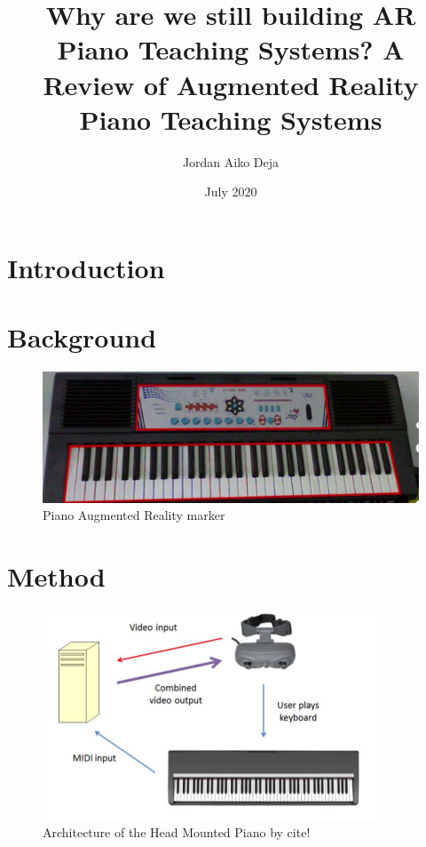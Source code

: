 \documentclass{article}
\title{Why are we still building AR Piano Teaching Systems? A Review of Augmented Reality Piano Teaching Systems}
\author{Jordan Aiko Deja}
\date{July 2020}
\begin{document}
\maketitle


\nocite{*}



\section{Introduction}

\section{Background}

\begin{figure}
    \centering
    \includegraphics[width=15cm]{figures/pianomarker.png}
    \caption{Piano Augmented Reality marker}
    \label{fig:pianomarker}
\end{figure}



\section{Method}

\begin{figure}
    \centering
    \includegraphics[width=10cm]{figures/headmountedpiano1.png}
    \caption{Architecture of the Head Mounted Piano by cite! }
    \label{fig:pianoheadmountedarch}
\end{figure}
\end{document}
